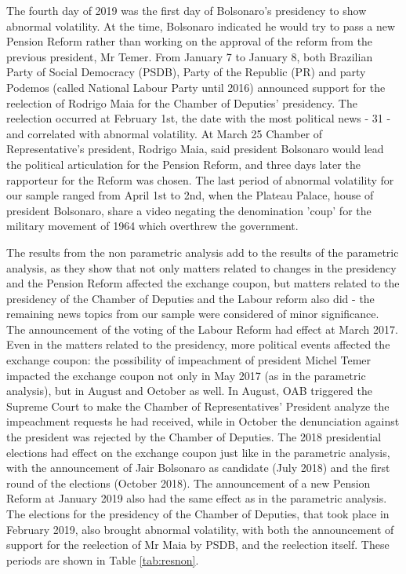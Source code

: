 \documentclass[cic,tc, english]{iiufrgs}
\begin{document}
    The fourth day of 2019 was the first day of Bolsonaro's presidency to show abnormal volatility. At the time, Bolsonaro indicated he would try to pass a new Pension Reform rather than working on the approval of the reform from the previous president, Mr Temer. From January 7 to January 8, both Brazilian Party of Social Democracy (PSDB), Party of the Republic (PR) and party Podemos (called National Labour Party until 2016) announced support for the reelection of Rodrigo Maia for the Chamber of Deputies' presidency. The reelection occurred at February 1st, the date with the most political news - 31 - and correlated with abnormal volatility. At March 25 Chamber of Representative's president, Rodrigo Maia, said president Bolsonaro would lead the political articulation for the Pension Reform, and three days later the rapporteur for the Reform was chosen. The last period of abnormal volatility for our sample ranged from April 1st to 2nd, when the Plateau Palace, house of president Bolsonaro, share a video negating the denomination 'coup' for the military movement of 1964 which overthrew the government.

    The results from the non parametric analysis add to the results of the parametric analysis, as they show that not only matters related to changes in the presidency and the Pension Reform affected the exchange coupon, but matters related to the presidency of the Chamber of Deputies and the Labour reform also did - the remaining news topics from our sample were considered of minor significance. The announcement of the voting of the Labour Reform had effect at March 2017. Even in the matters related to the presidency, more political events affected the exchange coupon: the possibility of impeachment of president Michel Temer impacted the exchange coupon not only in May 2017 (as in the parametric analysis), but in August and October as well. In August, OAB triggered the Supreme Court to make the Chamber of Representatives' President analyze the impeachment requests he had received, while in October the denunciation against the president was rejected by the Chamber of Deputies. The 2018 presidential elections had effect on the exchange coupon just like in the parametric analysis, with the announcement of Jair Bolsonaro as candidate (July 2018) and the first round of the elections (October 2018). The announcement of a new Pension Reform at January 2019 also had the same effect as in the parametric analysis. The elections for the presidency of the Chamber of Deputies, that took place in February 2019, also brought abnormal volatility, with both the announcement of support for the reelection of Mr Maia by PSDB, and the reelection itself. These periods are shown in Table \ref{tab:resnon}.
\end{document}
